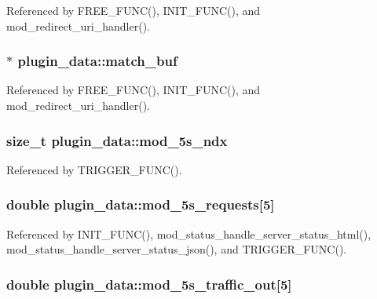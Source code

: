 Referenced by F\-R\-E\-E\-\_\-\-F\-U\-N\-C(), I\-N\-I\-T\-\_\-\-F\-U\-N\-C(), and mod\-\_\-redirect\-\_\-uri\-\_\-handler().

\hypertarget{structplugin__data_a21440c162a1ad6bb088b1aa3383b5c9a}{
\subsubsection[{match\-\_\-buf}]{ $\ast$ plugin\-\_\-data\-::match\-\_\-buf}}\label{structplugin__data_a21440c162a1ad6bb088b1aa3383b5c9a}


Referenced by F\-R\-E\-E\-\_\-\-F\-U\-N\-C(), I\-N\-I\-T\-\_\-\-F\-U\-N\-C(), and mod\-\_\-redirect\-\_\-uri\-\_\-handler().

\hypertarget{structplugin__data_a0ccf9e482f8266998ebf564e894e6c3e}{
\subsubsection[{mod\-\_\-5s\-\_\-ndx}]{\setlength{\rightskip}{0pt plus 5cm}size\-\_\-t plugin\-\_\-data\-::mod\-\_\-5s\-\_\-ndx}}\label{structplugin__data_a0ccf9e482f8266998ebf564e894e6c3e}


Referenced by T\-R\-I\-G\-G\-E\-R\-\_\-\-F\-U\-N\-C().

\hypertarget{structplugin__data_a7ac9d32371e9928a7d0c41b4d50c9cf2}{
\subsubsection[{mod\-\_\-5s\-\_\-requests}]{\setlength{\rightskip}{0pt plus 5cm}double plugin\-\_\-data\-::mod\-\_\-5s\-\_\-requests\mbox{[}5\mbox{]}}}\label{structplugin__data_a7ac9d32371e9928a7d0c41b4d50c9cf2}


Referenced by I\-N\-I\-T\-\_\-\-F\-U\-N\-C(), mod\-\_\-status\-\_\-handle\-\_\-server\-\_\-status\-\_\-html(), mod\-\_\-status\-\_\-handle\-\_\-server\-\_\-status\-\_\-json(), and T\-R\-I\-G\-G\-E\-R\-\_\-\-F\-U\-N\-C().

\hypertarget{structplugin__data_a5fabc1100c05abb648cec661b50918a8}{
\subsubsection[{mod\-\_\-5s\-\_\-traffic\-\_\-out}]{\setlength{\rightskip}{0pt plus 5cm}double plugin\-\_\-data\-::mod\-\_\-5s\-\_\-traffic\-\_\-out\mbox{[}5\mbox{]}}}\label{structplugin__data_a5fabc1100c05abb648cec661b50918a8}


